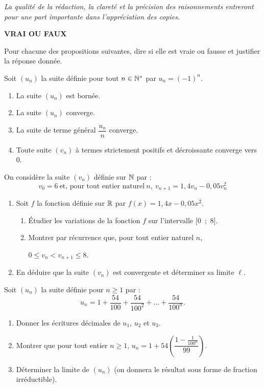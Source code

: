 \documentclass[a4paper,11pt,DIV12,BCOR0mm]{scrartcl}
\begin{document}
\emph{La qualité de la rédaction, la clareté et la précision des raisonnements 
entreront pour une part importante dans l'appréciation des copies.}
\medskip


\begin{exercice}
 \textbf{VRAI OU FAUX}
 
Pour chacune des propositions suivantes, dire si elle est vraie ou fausse et justifier la réponse donnée.


\medskip 

Soit $\left(u_{n}\right)$ la suite définie pour tout $n \in \mathbb{N}^*$ par $u_{n} = (-1)^n$.
 
\begin{enumerate}
\item La suite $\left(u_{n}\right)$ est bornée. 
\item La suite $\left(u_{n}\right)$ converge. 
\item La suite de terme général $\dfrac{u_{n}}{n}$ converge. 
\item  Toute suite $\left(v_{n}\right)$ à termes strictement positifs et décroissante converge vers $0$.
\end{enumerate}

\end{exercice}

\begin{exercice}
 On considère la suite $\left(v_{n}\right)$ définie sur $\mathbb{N}$ par :
\[v_{0} =  6~ \text{et, pour tout entier naturel}~ n,~v_{n+1} =  1,4v_{n} - 0,05v_{n}^2\]

\begin{enumerate}
\item  Soit $f$ la fonction définie sur $\mathbb{R}$ par $f(x) = 1,4x - 0,05x^2$.
	\begin{enumerate}
		\item  Étudier les variations de la fonction $f$ sur l'intervalle [0~;~8].
		\item  Montrer par récurrence que, pour tout entier naturel $n$,
		
 $0 \leqslant  v_{n} < v_{n+1} \leqslant  8$.
	\end{enumerate}

\item En déduire que la suite $\left(v_{n}\right)$ est convergente et déterminer sa limite $\ell$.
\end{enumerate}
\end{exercice}


\begin{exercice}
 Soit $(u_n)$ la suite définie pour $n\geq 1$ par :
\[
 u_n = 1 + \frac{54}{100} + \frac{54}{100^2} + \dots + \frac{54}{100^n}.
\]
\begin{enumerate}
 \item Donner les écritures décimales de $u_1$, $u_2$ et $u_3$.
 \item Montrer que pour tout entier $n\geq1$, $u_n=1+54\left(\dfrac{1-\frac{1}{100^n}}{99}\right).$
 \item Déterminer la limite de $(u_n)$ (on donnera le résultat sous forme de fraction irréductible).
\end{enumerate}

\end{exercice}
\end{document}
